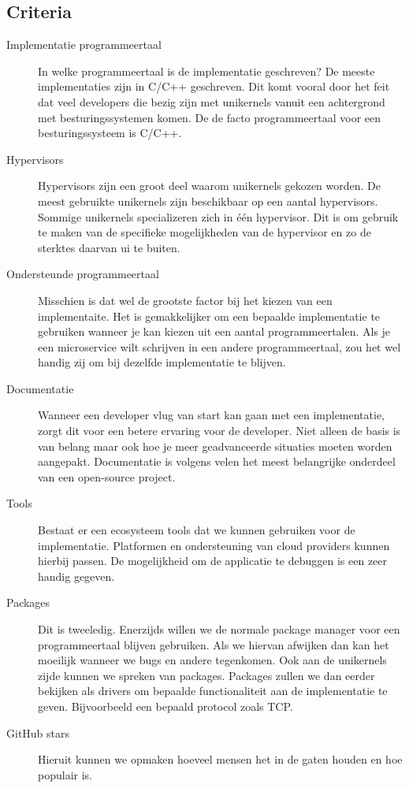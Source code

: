 \documentclass[pdftex,a4paper,12pt,twoside]{report}
\begin{document}
\subsection{Criteria}

\begin{description}
\item [Implementatie programmeertaal]
In welke programmeertaal is de implementatie geschreven? De meeste implementaties zijn in C/C++ geschreven. Dit komt vooral door het feit dat veel developers die bezig zijn met unikernels vanuit een achtergrond met besturingssystemen komen.
De de facto programmeertaal voor een besturingssysteem is C/C++.

\item [Hypervisors] 
Hypervisors zijn een groot deel waarom unikernels gekozen worden. De meest gebruikte unikernels zijn beschikbaar op een aantal hypervisors. Sommige unikernels specializeren zich in één hypervisor.
Dit is om gebruik te maken van de specifieke mogelijkheden van de hypervisor en zo de sterktes daarvan ui te buiten.

\item [Ondersteunde programmeertaal] 
Misschien is dat wel de grootste factor bij het kiezen van een implementaite. Het is gemakkelijker om een bepaalde implementatie te gebruiken wanneer je kan kiezen uit een aantal programmeertalen.
Als je een microservice wilt schrijven in een andere programmeertaal, zou het wel handig zij om bij dezelfde implementatie te blijven.

\item [Documentatie] 
Wanneer een developer vlug van start kan gaan met een implementatie, zorgt dit voor een betere ervaring voor de developer. Niet alleen de basis is van belang maar ook hoe je meer geadvanceerde situaties moeten worden aangepakt. Documentatie is volgens velen het meest belangrijke onderdeel van een open-source project.

\item [Tools] 
Bestaat er een ecosysteem tools dat we kunnen gebruiken voor de implementatie. Platformen en ondersteuning van cloud providers kunnen hierbij passen.
De mogelijkheid om de applicatie te debuggen is een zeer handig gegeven.

\item [Packages] 
Dit is tweeledig. Enerzijds willen we de normale package manager voor een programmeertaal blijven gebruiken. Als we hiervan afwijken dan kan het moeilijk wanneer we bugs en andere tegenkomen.
Ook aan de unikernels zijde kunnen we spreken van packages. Packages zullen we dan eerder bekijken als drivers om bepaalde functionaliteit aan de implementatie te geven. Bijvoorbeeld een bepaald protocol zoals TCP.

\item [GitHub stars] 
Hieruit kunnen we opmaken hoeveel mensen het in de gaten houden en hoe populair is.

\end{description}
\end{document}
